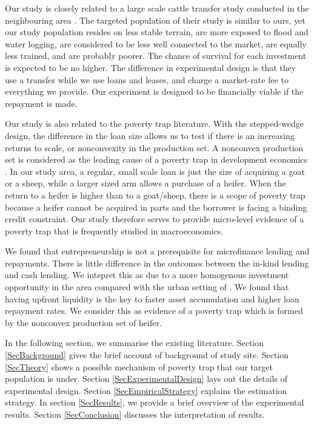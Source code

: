 	Our study is closely related to a large scale cattle transfer study conducted in the neighbouring area \citep{BandieraBRAC2017}. The targeted population of their study is similar to ours, yet our study population resides on less stable terrain, are more exposed to flood and water logging, are considered to be less well connected to the market, are equally less trained, and are probably poorer. The chance of survival for each investment is expected to be no higher. The difference in experimental design is that they use a transfer while we use loans and leases, and charge a market-rate fee to everything we provide. Our experiment is designed to be financially viable if the repayment is made. 

	Our study is also related to the poverty trap literature. With the stepped-wedge design, the difference in the loan size allows us to test if there is an increasing returns to scale, or nonconvexity in the production set. A nonconvex production set is considered as the leading cause of a poverty trap in development economics \citep{GalorZeira1993}. In our study area, a regular, small scale loan is just the size of acquiring a goat or a sheep, while a larger sized arm allows a purchase of a heifer. When the return to a heifer is higher than to a goat/sheep, there is a scope of poverty trap because a heifer cannot be acquired in parts and the borrower is facing a binding credit constraint. Our study therefore serves to provide micro-level evidence of a poverty trap that is frequently studied in macroeconomics.
	
	We found that entrepreneurship is not a prerequisite for microfinance lending and repayments. There is little difference in the outcomes between the in-kind lending and cash lending. We intepret this as due to a more homogenous investment opportunity in the area compared with the urban setting of \citet{Field2013}. We found that having upfront liquidity is the key to faster asset accumulation and higher loan repayment rates. We consider this as evidence of a poverty trap which is formed by the nonconvex production set of heifer. 

	In the following section, we summarise the existing literature. Section \ref{SecBackground} gives the brief account of background of study site. Section \ref{SecTheory} shows a possible mechanism of poverty trap that our target population is under. Section \ref{SecExperimentalDesign} lays out the details of experimental design. Section \ref{SecEmpiricalStrategy} explains the estimation strategy. In section \ref{SecResults}, we provide a brief overview of the experimental results. Section \ref{SecConclusion} discusses the interpretation of results.

